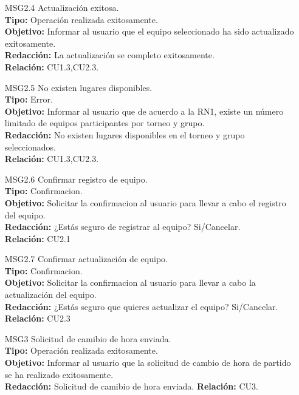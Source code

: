 \begin{itemize}
	\item[MSG2.4] Actualización exitosa.\\
	\textbf{Tipo:} Operación realizada exitosamente.\\
	\textbf{Objetivo:} Informar al usuario que el equipo seleccionado ha sido actualizado exitosamente.\\
	\textbf{Redacción:} La actualización se completo exitosamente.\\
	\textbf{Relación:} CU1.3,CU2.3.
	 
	 \item[MSG2.5] No existen lugares disponibles.\\
	 \textbf{Tipo:} Error.\\
	 \textbf{Objetivo:} Informar al usuario que de acuerdo a la RN1, existe un número limitado de equipos participantes por torneo y grupo.\\
	 \textbf{Redacción:} No existen lugares disponibles en el torneo y grupo seleccionados. \\
	 \textbf{Relación:} CU1.3,CU2.3.
	 	 
	 \item[MSG2.6] Confirmar registro de equipo.\\
	\textbf{Tipo:} Confirmacion.\\
	\textbf{Objetivo:} Solicitar la confirmacion al usuario para llevar a cabo el registro del equipo.\\
	\textbf{Redacción:} ¿Estás seguro de registrar al equipo? Si/Cancelar.\\
	\textbf{Relación:} CU2.1
	
	 \item[MSG2.7] Confirmar actualización de equipo.\\
	\textbf{Tipo:} Confirmacion.\\
	\textbf{Objetivo:} Solicitar la confirmacion al usuario para llevar a cabo la actualización del equipo.\\
	\textbf{Redacción:} ¿Estás seguro que quieres actualizar el equipo? Si/Cancelar.\\
	\textbf{Relación:} CU2.3	
	
	 \item[MSG3]  Solicitud de camibio de hora enviada.\\
	 \textbf{Tipo:} Operación realizada exitosamente.\\
	 \textbf{Objetivo:} Informar al usuario que la solicitud de cambio de hora de partido se ha realizado exitosamente.\\
	 \textbf{Redacción:} Solicitud de camibio de hora enviada.
	 \textbf{Relación:} CU3.
	 

\end{itemize}
